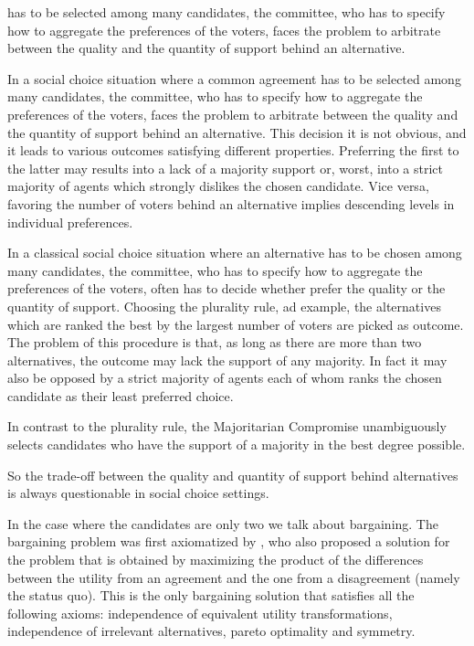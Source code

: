 \documentclass[version=3.21, pagesize, notitlepage, twoside=off, bibliography=totoc, DIV=calc, fontsize=11.5pt, a4paper]{scrartcl}
\begin{document}
	has to be selected among many candidates, the committee, who has to specify how to aggregate the preferences of the voters, faces the problem to arbitrate between the quality and the quantity of support behind an alternative.
	
	
	In a social choice situation where a common agreement has to be selected among many candidates, the committee, who has to specify how to aggregate the preferences of the voters, faces the problem to arbitrate between the quality and the quantity of support behind an alternative. This decision it is not obvious, and it leads to various outcomes satisfying different properties. Preferring the first to the latter may results into a lack of a majority support or, worst, into a strict majority of agents which strongly dislikes the chosen candidate. Vice versa, favoring the number of voters behind an alternative implies descending levels in individual preferences. 

In a classical social choice situation where an alternative has to be chosen among many candidates, the committee, who has to specify how to aggregate the preferences of the voters, often has to decide whether prefer the quality or the quantity of support. Choosing the plurality rule, ad example, the alternatives which are ranked the best by the largest number of voters are picked as outcome. The problem of this procedure is that, as long as there are more than two alternatives, the outcome may lack the support of any majority. In fact it may also be opposed by a strict majority of agents each of whom ranks the chosen candidate as their least preferred choice. 

In contrast to the plurality rule, the Majoritarian Compromise \cite{Sertel1999} unambiguously selects candidates who have the support of a majority in the best degree possible.

So the trade-off between the quality and quantity of support behind alternatives is always questionable in social choice settings.

In the case where the candidates are only two we talk about bargaining. The bargaining problem was first axiomatized by \cite{Nash1950}, who also proposed a solution for the problem that is obtained by maximizing the product of the differences between the utility from an agreement and the one from a disagreement (namely the status quo). This is the only bargaining solution that satisfies all the following axioms: independence of equivalent utility transformations, independence of irrelevant alternatives, pareto optimality and symmetry.
\end{document}
